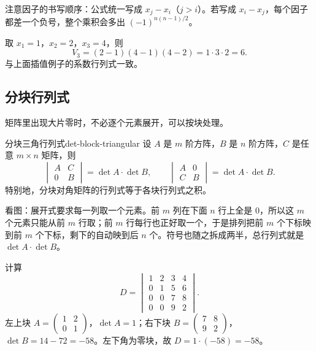 注意因子的书写顺序：公式统一写成 $x_j-x_i$（$j>i$）。若写成 $x_i-x_j$，每个因子都差一个负号，整个乘积会多出 $(-1)^{n(n-1)/2}$。

取 $x_1=1$，$x_2=2$，$x_3=4$，则
\[
V_3=(2-1)(4-1)(4-2)=1\cdot3\cdot2=6.
\]
与上面插值例子的系数行列式一致。

\subsection{分块行列式}

矩阵里出现大片零时，不必逐个元素展开，可以按块处理。

\begin{conclusion}{分块三角行列式}{det-block-triangular}
设 $A$ 是 $m$ 阶方阵，$B$ 是 $n$ 阶方阵，$C$ 是任意 $m\times n$ 矩阵，则
\[
\begin{vmatrix}A&C\\0&B\end{vmatrix}=\det A\cdot\det B,
\qquad
\begin{vmatrix}A&0\\C&B\end{vmatrix}=\det A\cdot\det B.
\]
特别地，分块对角矩阵的行列式等于各块行列式之积。
\end{conclusion}

\begin{center}
\end{center}

看图：展开式要求每一列取一个元素。前 $m$ 列在下面 $n$ 行上全是 $0$，所以这 $m$ 个元素只能从前 $m$ 行取；前 $m$ 行每行也正好取一个，于是排列把前 $m$ 个下标映到前 $m$ 个下标，剩下的自动映到后 $n$ 个。符号也随之拆成两半，总行列式就是 $\det A\cdot\det B$。

计算
\[
D=\begin{vmatrix}
1&2&3&4\\
0&1&5&6\\
0&0&7&8\\
0&0&9&2
\end{vmatrix}.
\]
左上块 $A=\begin{pmatrix}1&2\\0&1\end{pmatrix}$，$\det A=1$；右下块 $B=\begin{pmatrix}7&8\\9&2\end{pmatrix}$，$\det B=14-72=-58$。左下角为零块，故 $D=1\cdot(-58)=-58$。

